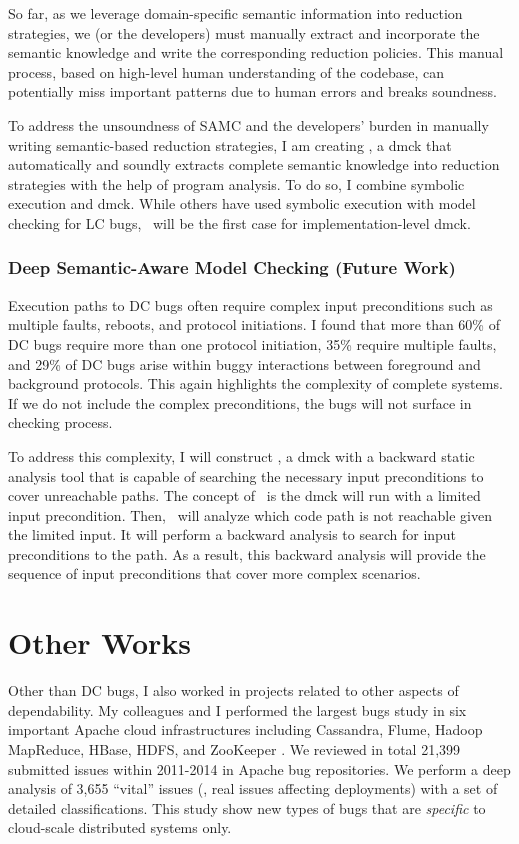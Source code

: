 \documentclass[11pt]{article}
\begin{document}
So far, as we leverage domain-specific semantic information into reduction
strategies, we (or the developers) must manually extract and incorporate the
semantic knowledge and write the corresponding reduction policies. This manual
process, based on high-level human understanding of the codebase, can
potentially miss important patterns due to human errors and breaks soundness.

To address the unsoundness of SAMC and the developers' burden in manually
writing semantic-based reduction strategies, I am creating \autocheck, a dmck
that automatically and soundly extracts complete semantic knowledge into
reduction strategies with the help of program analysis. To do so, I combine
symbolic execution and dmck. While others have used symbolic execution with
model checking for LC bugs, \autocheck\ will be the first case for
implementation-level dmck. 

\subsubsection*{Deep Semantic-Aware Model Checking (Future Work)}

Execution paths to DC bugs often require complex input preconditions such as
multiple faults, reboots, and protocol initiations. I found that more than 60\%
of DC bugs require more than one protocol initiation, 35\% require multiple
faults, and 29\% of DC bugs arise within buggy interactions between foreground
and background protocols.  This again highlights the complexity of complete
systems. If we do not include the complex preconditions, the bugs will not
surface in checking process.

To address this complexity, I will construct \deepcheck, a dmck with a backward
static analysis tool that is capable of searching the necessary input
preconditions to cover unreachable paths. The concept of \deepcheck\ is the dmck
will run with a limited input precondition. Then, \deepcheck\ will analyze which
code path is not reachable given the limited input. It will perform a backward
analysis to search for input preconditions to the path. As a result, this
backward analysis will provide the sequence of input preconditions that cover
more complex scenarios.

\section{Other Works}

Other than DC bugs, I also worked in projects related to other aspects of
dependability. My colleagues and I performed the largest bugs study in six
important Apache cloud infrastructures including Cassandra, Flume, Hadoop
MapReduce, HBase, HDFS, and ZooKeeper \cite{Gunawi+14-Cbs}. We reviewed in total
21,399 submitted issues within 2011-2014 in Apache bug repositories. We perform
a deep analysis of 3,655 ``vital'' issues (\ie, real issues affecting
deployments) with a set of detailed classifications. This study show new types
of bugs that are \textit{specific} to cloud-scale distributed systems only. 
\end{document}
